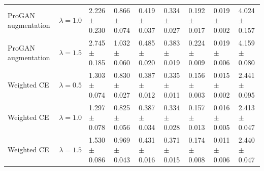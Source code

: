 \begin{tabular}{lllllllll}
ProGAN augmentation & $\lambda=1.0$ & \num{2.226} $\pm$ \num{0.230} & \num{0.866} $\pm$ \num{0.074} & \num{0.419} $\pm$ \num{0.037} & \num{0.334} $\pm$ \num{0.027} & \num{0.192} $\pm$ \num{0.017} & \num{0.019} $\pm$ \num{0.002} & \num{4.024} $\pm$ \num{0.157}\\
ProGAN augmentation & $\lambda=1.5$ & \num{2.745} $\pm$ \num{0.185} & \num{1.032} $\pm$ \num{0.060} & \num{0.485} $\pm$ \num{0.020} & \num{0.383} $\pm$ \num{0.019} & \num{0.224} $\pm$ \num{0.009} & \num{0.019} $\pm$ \num{0.006} & \num{4.159} $\pm$ \num{0.080}\\
Weighted CE & $\lambda=0.5$ & \num{1.303} $\pm$ \num{0.074} & \num{0.830} $\pm$ \num{0.027} & \num{0.387} $\pm$ \num{0.012} & \num{0.335} $\pm$ \num{0.011} & \num{0.156} $\pm$ \num{0.003} & \num{0.015} $\pm$ \num{0.002} & \num{2.441} $\pm$ \num{0.095}\\
Weighted CE & $\lambda=1.0$ & \num{1.297} $\pm$ \num{0.078} & \num{0.825} $\pm$ \num{0.056} & \num{0.387} $\pm$ \num{0.034} & \num{0.334} $\pm$ \num{0.028} & \num{0.157} $\pm$ \num{0.013} & \num{0.016} $\pm$ \num{0.005} & \num{2.413} $\pm$ \num{0.047}\\
Weighted CE & $\lambda=1.5$ & \num{1.530} $\pm$ \num{0.086} & \num{0.969} $\pm$ \num{0.043} & \num{0.431} $\pm$ \num{0.016} & \num{0.371} $\pm$ \num{0.015} & \num{0.174} $\pm$ \num{0.008} & \num{0.011} $\pm$ \num{0.006} & \num{2.440} $\pm$ \num{0.047}\\
\bottomrule
\end{tabular}
